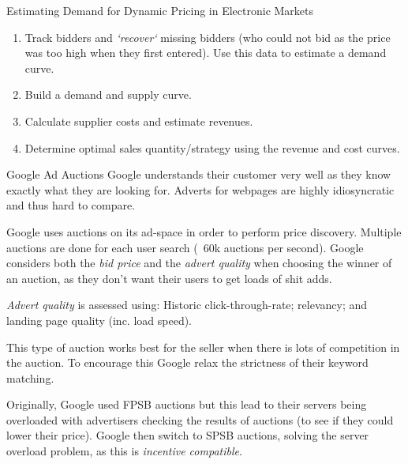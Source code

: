 \documentclass[11pt,a4paper]{article}
\begin{document}
\begin{proposition}{Estimating Demand for Dynamic Pricing in Electronic Markets}
  \begin{enumerate}
    \item Track bidders and \textit{`recover`} missing bidders (who could not bid as the price was too high when they first entered). Use this data to estimate a demand curve.
    \item Build a demand and supply curve.
    \item Calculate supplier costs and estimate revenues.
    \item Determine optimal sales quantity/strategy using the revenue and cost curves.
  \end{enumerate}
\end{proposition}

\begin{remark}{Google Ad Auctions}
  Google understands their customer very well as they know exactly what they are looking for. Adverts for webpages are highly idiosyncratic and thus hard to compare.
  \par Google uses auctions on its ad-space in order to perform price discovery. Multiple auctions are done for each user search (~60k auctions per second). Google considers both the \textit{bid price} and the \textit{advert quality} when choosing the winner of an auction, as they don't want their users to get loads of shit adds.
  \par \textit{Advert quality} is assessed using: Historic click-through-rate; relevancy; and landing page quality (inc. load speed).
  \par This type of auction works best for the seller when there is lots of competition in the auction. To encourage this Google relax the strictness of their keyword matching.
  \par Originally, Google used FPSB auctions but this lead to their servers being overloaded with advertisers checking the results of auctions (to see if they could lower their price). Google then switch to SPSB auctions, solving the server overload problem, as this is \textit{incentive compatible}.
\end{remark}
\end{document}
